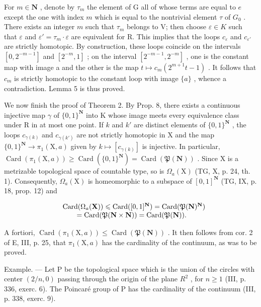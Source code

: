 For \(m \in \mathbf{N}\) , denote by \(\tau_m\) the element of G all of whose terms are equal to \(e\) except the one with index \(m\) which is equal to the nontrivial element \(\tau\) of \(G_0\) . There exists an integer \(m\) such that \(\tau_m\) belongs to V; then choose \(\varepsilon \in K\) such that \(\varepsilon\) and \(\varepsilon' = \tau_m \cdot \varepsilon\) are equivalent for R. This implies that the loops \(c_{\varepsilon}\) and \(c_{\varepsilon'}\) are strictly homotopic. By construction, these loops coincide on the intervals \([0, 2^{-m-1}]\) and \([2^{-m}, 1]\) ; on the interval \([2^{-m-1}, 2^{-m}]\) , one is the constant map with image a and the other is the map \(t \mapsto c_{m}(2^{m+1}t - 1)\) . It follows that \(c_{m}\) is strictly homotopic to the constant loop with image \(\{a\}\) , whence a contradiction. Lemma 5 is thus proved.

We now finish the proof of Theorem 2. By Prop. 8, there exists a continuous injective map \(\gamma\) of \(\{0,1\}^{\mathbf{N}}\) into K whose image meets every equivalence class under R in at most one point. If \(k\) and \(k'\) are distinct elements of \(\{0,1\}^{\mathbf{N}}\) , the loops \(c_{\gamma(k)}\) and \(c_{\gamma(k')}\) are not strictly homotopic in X and the map \(\{0,1\}^{\mathbf{N}} \to \pi_1(\mathrm{X},a)\) given by \(k \mapsto [c_{\gamma(k)}]\) is injective. In particular, \(\operatorname{Card}(\pi_1(\mathrm{X},a)) \geqslant \operatorname{Card}(\{0,1\}^{\mathbf{N}}) = \operatorname{Card}(\mathfrak{P}(\mathbf{N}))\) . Since X is a metrizable topological space of countable type, so is \(\Omega_a(\mathrm{X})\) (TG, X, p. 24, th. 1). Consequently, \(\Omega_a(\mathrm{X})\) is homeomorphic to a subspace of \([0,1]^{\mathbf{N}}\) (TG, IX, p. 18, prop. 12) and

\[
\begin{array}{r l} & {\mathrm{Card} (\Omega_ {a} (\mathbf {X})) \leqslant \mathrm{Card} ([ 0, 1 ] ^ {\mathbf {N}}) = \mathrm{Card} (\mathfrak {P} (\mathbf {N}) ^ {\mathbf {N}})} \\ & {\qquad = \mathrm{Card} (\mathfrak {P} (\mathbf {N} \times \mathbf {N})) = \mathrm{Card} (\mathfrak {P} (\mathbf {N})).} \end{array}
\]

A fortiori, \(\operatorname{Card}(\pi_{1}(\mathrm{X},a))\leqslant\operatorname{Card}(\mathfrak{P}(\mathbf{N}))\) . It then follows from cor. 2 of E, III, p. 25, that \(\pi_{1}(\mathrm{X},a)\) has the cardinality of the continuum, as was to be proved.

Example. --- Let P be the topological space which is the union of the circles with center \((2/n,0)\) passing through the origin of the plane \(R^{2}\) , for \(n \geqslant 1\) (III, p. 336, exerc. 6). The Poincaré group of P has the cardinality of the continuum (III, p. 338, exerc. 9).

